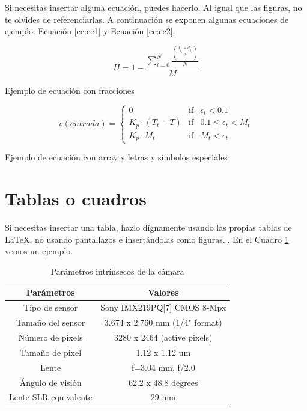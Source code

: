 Si necesitas insertar alguna ecuación, puedes hacerlo. Al igual que las figuras, no te olvides de referenciarlas. A continuación se exponen algunas ecuaciones de ejemplo: Ecuación \ref{ec:ec1} y Ecuación \ref{ec:ec2}.

\begin{myequation}[h]
\begin{equation}
H = 1 - \frac{\sum_{i=0}^{N}\frac{(\frac{d_{j_s} + d_{j_e}}{2})}{N}}{M}
\nonumber
\label{ec:ec1}
\end{equation}
\caption[Ejemplo de ecuación con fracciones]{Ejemplo de ecuación con fracciones}
\end{myequation} 

\begin{myequation}[h]
\begin{equation}
v(entrada)= \left\{
	\begin{array}{lcc}
		0 & \mbox{if} & \epsilon_t < 0.1\\
		K_p\cdot{(T_{t}-T)} & \mbox{if}& 0.1 \leq \epsilon_t < M_t\\
		K_p \cdot M_t & \mbox{if}& M_t < \epsilon_t
	\end{array}
\right.
\label{ec:ec2}
\end{equation}
\caption[Ejemplo de ecuación con array y letras y símbolos especiales]{Ejemplo de ecuación con array y letras y símbolos especiales}
\end{myequation}

\section{Tablas o cuadros}

Si necesitas insertar una tabla, hazlo dígnamente usando las propias tablas de \LaTeX, no usando pantallazos e insertándolas como figuras... En el Cuadro \ref{cuadro:ejemplo} vemos un ejemplo.

\begin{table}[H]
\begin{center}
\begin{tabular}{|c|c|}
\hline
\textbf{Parámetros} & \textbf{Valores} \\
\hline
Tipo de sensor & Sony IMX219PQ[7] CMOS 8-Mpx \\
Tamaño del sensor & 3.674 x 2.760 mm (1/4" format) \\
Número de pixels & 3280 x 2464 (active pixels) \\
Tamaño de pixel & 1.12 x 1.12 um \\
Lente & f=3.04 mm, f/2.0 \\
Ángulo de visión & 62.2 x 48.8 degrees \\
Lente SLR equivalente & 29 mm \\
\hline
\end{tabular}
\caption{Parámetros intrínsecos de la cámara}
\label{cuadro:ejemplo}
\end{center}
\end{table}

